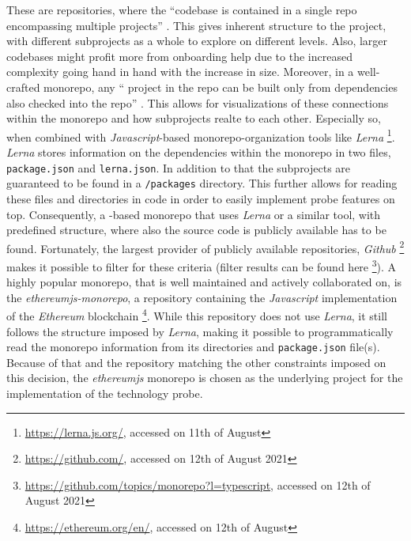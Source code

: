 These are repositories, where the \enquote{codebase is contained in a single repo encompassing multiple projects} \cite[p. 226]{jaspan2018advantages}. This gives inherent structure to the project, with different subprojects as a whole to explore on different levels. Also, larger codebases might profit more from onboarding help due to the increased complexity going hand in hand with the increase in size. Moreover, in a well-crafted monorepo, any \enquote{ project in the repo can be built only from dependencies also checked into the repo} \cite[p. 226]{jaspan2018advantages}. This allows for visualizations of these connections within the monorepo and how subprojects realte to each other. Especially so, when combined with \textit{Javascript}-based monorepo-organization tools like \textit{Lerna} \footnote{\url{https://lerna.js.org/}, accessed on 11th of August}. \textit{Lerna} stores information on the dependencies within the monorepo in two files, \verb|package.json| and \verb|lerna.json|. In addition to that the subprojects are guaranteed to be found in a \verb|/packages| directory. This further allows for reading these files and directories in code in order to easily implement probe features on top. Consequently, a -based monorepo that uses \textit{Lerna} or a similar tool, with predefined structure, where also the source code is publicly available has to be found. Fortunately, the largest provider of publicly available repositories, \textit{Github} \footnote{\url{https://github.com/}, accessed on 12th of August 2021} makes it possible to filter for these criteria (filter results can be found here \footnote{\url{https://github.com/topics/monorepo?l=typescript}, accessed on 12th of August 2021}). A highly popular monorepo, that is well maintained and actively collaborated on, is the \textit{ethereumjs-monorepo}, a repository containing the \textit{Javascript} implementation of the \textit{Ethereum} blockchain \footnote{\url{https://ethereum.org/en/}, accessed on 12th of August}. While this repository does not use \textit{Lerna}, it still follows the structure imposed by \textit{Lerna}, making it possible to programmatically read the monorepo information from its directories and \verb|package.json| file(s). Because of that and the repository matching the other constraints imposed on this decision, the \textit{ethereumjs} monorepo is chosen as the underlying project for the implementation of the technology probe.

